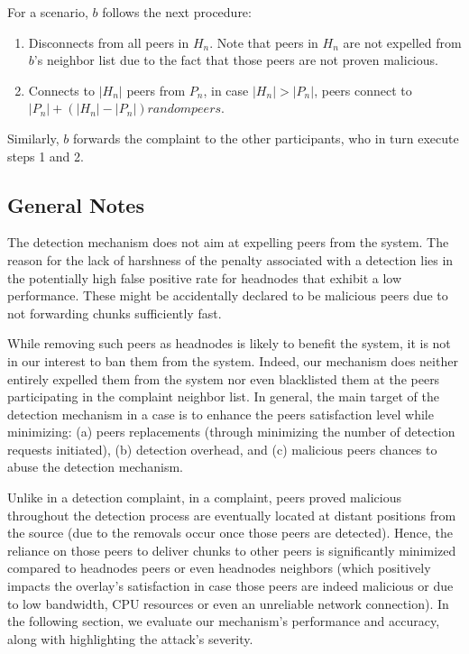 For a \drop scenario, $b$ follows the next procedure:
\begin{enumerate}
 \item Disconnects from all peers in $H_n$. Note that peers in $H_n$ are not expelled from $b$'s neighbor list due to the fact that those peers are not proven malicious. 
 \item Connects to $|H_n|$ peers from $P_n$, in case $|H_n|>|P_n|$, peers connect to $|P_n|+(|H_n|-|P_n|)random peers$.
\end{enumerate}
Similarly, $b$ forwards the complaint to the other participants, who in turn execute steps 1 and 2.

\subsection{General Notes}
The detection mechanism does not aim at expelling peers from the system.
The reason for the lack of harshness of the penalty associated with a detection lies in the potentially high false positive rate for headnodes that exhibit a low performance. These might be accidentally declared to be malicious peers due to not forwarding chunks sufficiently fast. 

While removing such peers as headnodes is likely to benefit the system, it is not in our interest to ban them from the system. Indeed, our mechanism does neither entirely expelled them from the system nor even blacklisted them at the peers participating in the complaint neighbor list. 
In general, the main target of the detection mechanism in a \drop case is to enhance the peers satisfaction level while minimizing: (a) peers replacements (through minimizing the number of detection requests initiated), (b) detection overhead, and (c) malicious peers chances to abuse the detection mechanism.

Unlike in a \drop detection complaint, in a \block complaint, peers proved malicious throughout the detection process are eventually located at distant positions from the source (due to the removals occur once those peers are detected).
Hence, the reliance on those peers to deliver chunks to other peers is significantly minimized compared to headnodes peers or even headnodes neighbors (which positively impacts the overlay's satisfaction in case those peers are indeed malicious or due to low bandwidth, CPU resources or even an unreliable network connection).
In the following section, we evaluate our mechanism's performance and accuracy, along with highlighting the attack's severity.



